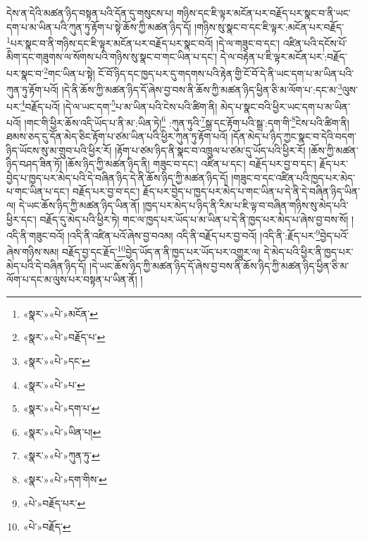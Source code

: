 དེས་ན་དེའི་མཚན་ཉིད་བསྟན་པའི་དོན་དུ་གསུངས་པ། གཉིས་དང་ཇི་ལྟར་མངོན་པར་བརྗོད་པར་སྣང་བ་ནི་ཡང་དག་པ་མ་ཡིན་པའི་ཀུན་ཏུ་རྟོག་པ་སྟེ་ཆོས་ཀྱི་མཚན་ཉིད་དོ། །གཉིས་སུ་སྣང་བ་དང་ཇི་ལྟར་:མངོན་པར་བརྗོད་\footnote{«སྣར་»«པེ་»མངོན་}པར་སྣང་བ་ནི་གཉིས་དང་ཇི་ལྟར་མངོན་པར་བརྗོད་པར་སྣང་བའོ། །དེ་ལ་གཟུང་བ་དང་། འཛིན་པའི་དངོས་པོ་མིག་དང་གཟུགས་ལ་སོགས་པའི་གཉིས་སུ་སྣང་བ་གང་ཡིན་པ་དང་། དེ་ལ་བརྟེན་པ་ཇི་ལྟར་མངོན་པར་:བརྗོད་པར་སྣང་བ་\footnote{«སྣར་»«པེ་»བརྗོད་པ་}གང་ཡིན་པ་སྟེ། ངོ་བོ་ཉིད་དང་ཁྱད་པར་དུ་གདགས་པའི་རྟེན་གྱི་ངོ་བོ་དེ་ནི་ཡང་དག་པ་མ་ཡིན་པའི་ཀུན་ཏུ་རྟོག་པའོ། །དེ་ནི་ཆོས་ཀྱི་མཚན་ཉིད་དོ་ཞེས་བྱ་བས་ནི་ཆོས་ཀྱི་མཚན་ཉིད་ཕྱིན་ཅི་མ་ལོག་པ་:དང་མ་\footnote{«སྣར་»«པེ་»དང་}ལུས་པར་\footnote{«སྣར་»«པེ་»པ་}བརྗོད་པའོ། །དེ་ལ་ཡང་དག་\footnote{«སྣར་»«པེ་»དག་པ་}པ་མ་ཡིན་པའི་ངེས་པའི་ཚིག་ནི། མེད་པ་སྣང་བའི་ཕྱིར་ཡང་དག་པ་མ་ཡིན་པའོ། །གང་གི་ཕྱིར་ཆོས་འདི་ཡོད་པ་ནི་མ་:ཡིན་ཏེ།\footnote{«སྣར་»«པེ་»ཡིན་པ།} :ཀུན་ཏུའི་\footnote{«སྣར་»«པེ་»ཀུན་ཏུ་}སྒྲ་དང་རྟོག་པའི་སྒྲ་:དག་གི་\footnote{«སྣར་»«པེ་»དག་གིས་}ངེས་པའི་ཚིག་ནི། ཐམས་ཅད་དུ་དོན་མེད་ཅིང་རྟོག་པ་ཙམ་ཡིན་པའི་ཕྱིར་ཀུན་ཏུ་རྟོག་པའོ། །དོན་མེད་པ་ཉིད་ཀྱང་སྣང་བ་དེའི་བདག་ཉིད་ཡོངས་སུ་མ་གྲུབ་པའི་ཕྱིར་རོ། །རྟོག་པ་ཙམ་ཉིད་ནི་སྣང་བ་འཁྲུལ་པ་ཙམ་དུ་ཡོད་པའི་ཕྱིར་རོ། །ཆོས་ཀྱི་མཚན་ཉིད་བཤད་ཟིན་ཏོ། །ཆོས་ཉིད་ཀྱི་མཚན་ཉིད་ནི། གཟུང་བ་དང་། འཛིན་པ་དང་། བརྗོད་པར་བྱ་བ་དང་། རྗོད་པར་བྱེད་པ་ཁྱད་པར་མེད་པའི་དེ་བཞིན་ཉིད་དེ་ནི་ཆོས་ཉིད་ཀྱི་མཚན་ཉིད་དོ། །གཟུང་བ་དང་འཛིན་པའི་ཁྱད་པར་མེད་པ་གང་ཡིན་པ་དང་། བརྗོད་པར་བྱ་བ་དང་། རྗོད་པར་བྱེད་པ་ཁྱད་པར་མེད་པ་གང་ཡིན་པ་དེ་ནི་དེ་བཞིན་ཉིད་ཡིན་ལ། དེ་ཡང་ཆོས་ཉིད་ཀྱི་མཚན་ཉིད་ཡིན་ནོ། །ཁྱད་པར་མེད་པ་ཉིད་ནི་རིམ་པ་ཇི་ལྟ་བ་བཞིན་གཉིས་སུ་མེད་པའི་ཕྱིར་དང་། བརྗོད་དུ་མེད་པའི་ཕྱིར་ཏེ། གང་ལ་ཁྱད་པར་ཡོད་པ་མ་ཡིན་པ་དེ་ནི་ཁྱད་པར་མེད་པ་ཞེས་བྱ་བས་སོ། །འདི་ནི་གཟུང་བའོ། །འདི་ནི་འཛིན་པའོ་ཞེས་བྱ་བའམ། འདི་ནི་བརྗོད་པར་བྱ་བའོ། །འདི་ནི་:རྗོད་པར་\footnote{«པེ་»བརྗོད་པར་}བྱེད་པའོ་ཞེས་གཉིས་སམ། བརྗོད་བྱ་དང་རྗོད་\footnote{«པེ་»བརྗོད་}བྱེད་ཡོད་ན་ནི་ཁྱད་པར་ཡོད་པར་འགྱུར་ལ། དེ་མེད་པའི་ཕྱིར་ནི་ཁྱད་པར་མེད་པའི་དེ་བཞིན་ཉིད་དོ། །དེ་ཡང་ཆོས་ཉིད་ཀྱི་མཚན་ཉིད་དོ་ཞེས་བྱ་བས་ནི་ཆོས་ཉིད་ཀྱི་མཚན་ཉིད་ཕྱིན་ཅི་མ་ལོག་པ་དང་མ་ལུས་པར་བསྟན་པ་ཡིན་ནོ། །
